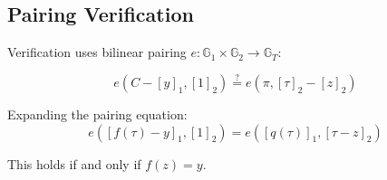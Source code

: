 \subsection{Pairing Verification}

Verification uses bilinear pairing $e: \mathbb{G}_1 \times \mathbb{G}_2 \rightarrow \mathbb{G}_T$:

\begin{equation}
    e(C - [y]_1, [1]_2) \stackrel{?}{=} e(\pi, [\tau]_2 - [z]_2)
\end{equation}

Expanding the pairing equation:
\begin{equation}
    e([f(\tau) - y]_1, [1]_2) = e([q(\tau)]_1, [\tau - z]_2)
\end{equation}

This holds if and only if $f(z) = y$.

